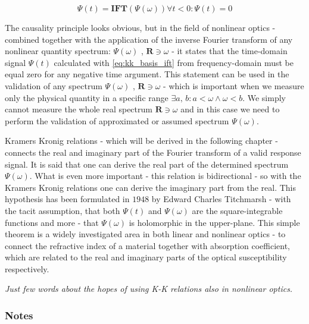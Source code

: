 \documentclass[12pt,twoside,a4paper]{article}
\numberwithin{equation}{subsection}
\numberwithin{figure}{subsection}
\begin{document}
\begin{subequations}  \label{eq:kk_basis}
 \begin{equation}  \label{eq:kk_basis_ift}
   \Psi (t) = \mathbf{IFT}(\Psi (\omega ))
  \end{equation}
  \begin{equation} \label{eq:kk_basis_casuality}
    \forall t < 0 : \Psi (t) = 0
  \end{equation}
\end{subequations}

The causality principle looks obvious, but in the field of nonlinear optics - combined together with the application of the inverse Fourier
transform of any nonlinear quantity spectrum: $\Psi (\omega )$ , $\textbf{R} \ni \omega$ - it states that the time-domain signal 
$\Psi (t)$ calculated with \ref{eq:kk_basis_ift} from frequency-domain must be equal zero for any negative time argument. This
statement can be used in the validation of any spectrum $\Psi (\omega )$ , $\textbf{R} \ni \omega$ - which is important when we
measure only the physical quantity in a specific range $\exists a,\,b : a < \omega \wedge \omega < b$. We simply cannot measure the
whole real spectrum $\textbf{R} \ni \omega $ and in this case we need to perform the validation of approximated or assumed spectrum $\Psi (\omega )$.

Kramers Kronig relations - which will be derived in the following chapter - connects the real and imaginary part of the Fourier
transform of a valid response signal. It is said that one can derive the real part of the determined spectrum $\Psi (\omega )$.
What is even more important - this relation is bidirectional - so with the Kramers Kronig relations one can derive the imaginary
part from the real. This hypothesis has been formulated in $1948$ by Edward Charles Titchmarsh - with the tacit assumption, that
both $\Psi (t)$ and $\Psi (\omega )$ are the square-integrable functions and more - that $\Psi (\omega )$ is holomorphic in the
upper-plane. This simple theorem is a widely investigated area in both linear and nonlinear optics - to connect the refractive
index of a material together with absorption coefficient, which are related to the real and imaginary parts of the optical
susceptibility respectively.

\textit{Just few words about the hopes of using K-K relations also in nonlinear optics.}

\subsubsection*{Notes}
\end{document}
